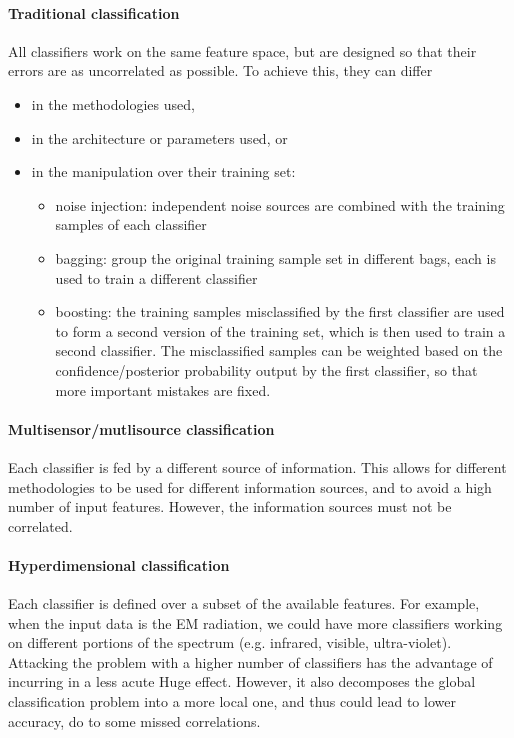 \documentclass[oneside,onecolumn]{report}
\begin{document}
\paragraph{Traditional classification}
All classifiers work on the same feature space, but are designed so that their errors are as uncorrelated as possible.
To achieve this, they can differ
\begin{itemize}
    \item in the methodologies used,
    \item in the architecture or parameters used, or
    \item in the manipulation over their training set:
    \begin{itemize}
        \item noise injection: independent noise sources are combined with the training samples of each classifier
        \item bagging: group the original training sample set in different bags, each is used to train a different classifier
        \item boosting: the training samples misclassified by the first classifier are used to form a second version of the training set, which is then used to train a second classifier.
        The misclassified samples can be weighted based on the confidence/posterior probability output by the first classifier, so that more important mistakes are fixed.
    \end{itemize}
\end{itemize}

\paragraph{Multisensor/mutlisource classification}
Each classifier is fed by a different source of information.
This allows for different methodologies to be used for different information sources, and to avoid a high number of input features.
However, the information sources must not be correlated.

\paragraph{Hyperdimensional classification}
Each classifier is defined over a subset of the available features.
For example, when the input data is the EM radiation, we could have more classifiers working on different portions of the spectrum (e.g. infrared, visible, ultra-violet).
Attacking the problem with a higher number of classifiers has the advantage of incurring in a less acute Huge effect.
However, it also decomposes the global classification problem into a more local one, and thus could lead to lower accuracy, do to some missed correlations.
\end{document}
